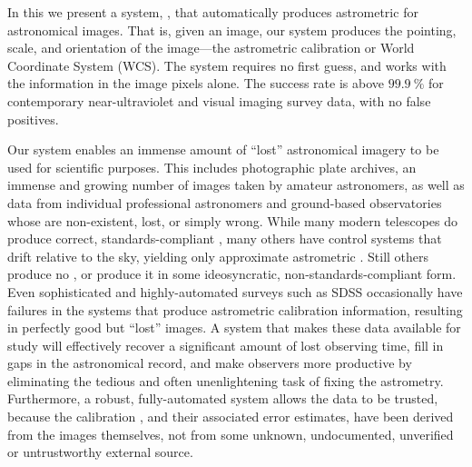 In this \doctype we present a system, \an, that automatically
produces astrometric \metadata for astronomical images.  That is,
given an image, our system produces the pointing, scale, and
orientation of the image---the astrometric calibration \metadata or
World Coordinate System (WCS).  The system requires no first guess,
and works with the information in the image pixels alone.  The success
rate is above $99.9~\percent$ for contemporary near-ultraviolet and
visual imaging survey data, with no false positives.





Our system enables an immense amount of ``lost'' astronomical imagery
to be used for scientific purposes.  This includes photographic plate
archives, an immense and growing number of images taken by amateur
astronomers, as well as data from individual professional astronomers
and ground-based observatories whose \metadata are non-existent,
lost, or simply wrong.  While many modern telescopes do produce
correct, standards-compliant \metadata, many others have control
systems that drift relative to the sky, yielding only approximate
astrometric \metadata.  Still others produce no \metadata, or produce
it in some ideosyncratic, non-standards-compliant form.  Even
sophisticated and highly-automated surveys such as SDSS occasionally
have failures in the systems that produce astrometric calibration
information, resulting in perfectly good but ``lost'' images.  A
system that makes these data available for study will effectively
recover a significant amount of lost observing time, fill in gaps in
the astronomical record, and make observers more productive by
eliminating the tedious and often unenlightening task of fixing the
astrometry.  Furthermore, a robust, fully-automated system allows the
data to be trusted, because the calibration \metadata, and their
associated error estimates, have been derived from the images
themselves, not from some unknown, undocumented, unverified or
untrustworthy external source.



